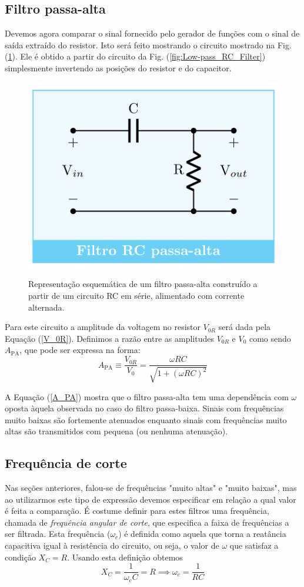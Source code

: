 \documentclass[letterpaper, 12pt]{article}
\begin{document}
\subsection{Filtro passa-alta}
Devemos agora comparar o sinal fornecido pelo gerador de funções com o sinal de saída extraído do resistor. Isto será feito mostrando o circuito mostrado na Fig. (\ref{fig:High-pass_RC_Filter}). Ele é obtido a partir do circuito da Fig. (\ref{fig:Low-pass_RC_Filter}) simplesmente invertendo as posições do resistor e do capacitor. 
\begin{figure}[h]
    \centering
    \includegraphics[width=0.5\linewidth]{figures/High-pass_RC_Filter.png}
    \label{fig:High-pass_RC_Filter}
    \caption{Representação esquemática de um filtro passa-alta construído a partir de um circuito RC em série, alimentado com corrente alternada.}
\end{figure}

Para este circuito a amplitude da voltagem no resistor $V_{0R}$ será dada pela Equação (\ref{V_0R}). Definimos a razão entre as amplitudes $V_{0R}$ e $V_{0}$ como sendo $A_{\text{PA}}$, que pode ser expressa na forma:
\begin{equation}\label{A_PA}
    A_{\text{PA}}\equiv\frac{V_{0R}}{V_{0}}=\frac{\omega RC}{\sqrt{1+(\omega RC)^{2}}}
\end{equation}

A Equação (\ref{A_PA}) mostra que o filtro passa-alta tem uma dependência com $\omega$ oposta àquela observada no caso do filtro passa-baixa. Sinais com frequências muito baixas são fortemente atenuados enquanto sinais com frequências muito altas são transmitidos com pequena (ou nenhuma atenuação).


\subsection{Frequência de corte}
Nas seções anteriores, falou-se de frequências "muito altas" e "muito baixas", mas ao utilizarmos este tipo de expressão devemos especificar em relação a qual valor é feita a comparação. É costume definir para estes filtros uma frequência, chamada de \textit{frequência angular de corte}, que especifica a faixa de frequências a ser filtrada. Esta frequência ($\omega_{c}$) é definida como aquela que torna a reatância capacitiva igual à resistência do circuito, ou seja, o valor de $\omega$ que satisfaz a condição $X_{C}=R$. Usando esta definição obtemos
\begin{equation}\label{Freq. angular de corte}
    X_{C}=\frac{1}{\omega_{c}C}=R\implies\omega_{c}=\frac{1}{RC}
\end{equation}
\end{document}
